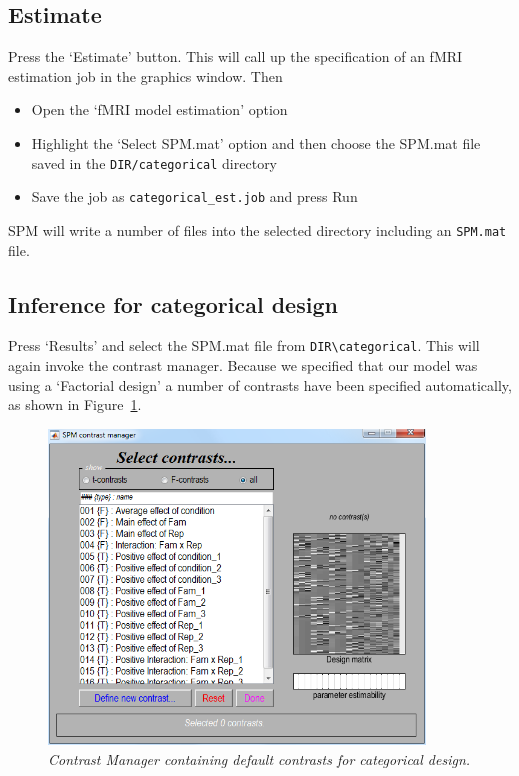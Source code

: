 \documentclass[a4paper,titlepage]{book}
\newcommand{\bi}{\begin{itemize}}
\newcommand{\ei}{\end{itemize}}
\begin{document}
\subsection{Estimate}

Press the `Estimate' button. This will call up the specification of an fMRI estimation job in the graphics window. Then
\bi
\item{Open the `fMRI model estimation' option}
\item{Highlight the `Select SPM.mat' option and then choose the SPM.mat
file saved in the \verb!DIR/categorical! directory}
\item{Save the job as \verb!categorical_est.job! and press Run}
\ei
SPM will write a number of files into the selected directory including 
an \verb!SPM.mat! file.

\subsection{Inference for categorical design}

Press `Results' and select the SPM.mat file from 
\verb!DIR\categorical!. This will again invoke the contrast manager. Because we specified that 
our model was using a `Factorial design' a number of 
contrasts have been specified automatically, as shown 
in Figure~\ref{cat_contrasts}.
\begin{figure}
\begin{center}
\includegraphics[width=100mm]{cat_contrasts}
\caption{\em Contrast Manager containing default contrasts for categorical design. \label{cat_contrasts}}
\end{center}
\end{figure}
\end{document}
